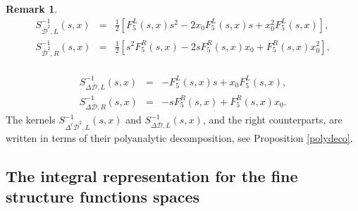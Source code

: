 \documentclass[reqno,11pt]{amsart}
\numberwithin{equation}{section}
\theoremstyle{definition}
\newtheorem{remark}[theorem]{{\bf Remark}}
\begin{document}
\begin{remark}
\begin{eqnarray*}
S^{-1}_{\mathcal{\overline{D}}^{2},L}(s,x)&=&\frac{1}{2}[F_{5}^{L}(s,x)s^2-2x_0 F_{5}^{L}(s,x)s+ x_0^2 F_{5}^{L}(s,x)],\\
\nonumber
S^{-1}_{\mathcal{\overline{D}}^{2},R}(s,x)&=&\frac{1}{2}[s^2F_{5}^{R}(s,x)-2 sF_{5}^{R}(s,x)x_0+  F_{5}^{R}(s,x)x_0^2],\\
\nonumber
\end{eqnarray*}

\begin{eqnarray*}
S^{-1}_{\Delta\mathcal{\overline{D}},L}(s,x)&=&-F_{5}^L(s,x)s+x_0 F_{5}^L(s,x),\\
\nonumber
S^{-1}_{\Delta\mathcal{\overline{D}},R}(s,x)&=&-sF_{5}^R(s,x)+ F_{5}^R(s,x)x_0.
\end{eqnarray*}
The kernels $ S^{-1}_{\Delta^{\ell} \mathcal{\overline{D}}^{2},L}(s,x)$ and $S^{-1}_{\Delta \mathcal{\overline{D}},L}(s,x)$, and the right counterparts, are written in terms of their polyanalytic decomposition, see  Proposition \ref{polydeco}.
\end{remark}


\subsection{The integral representation for the fine structure functions spaces}
\end{document}

